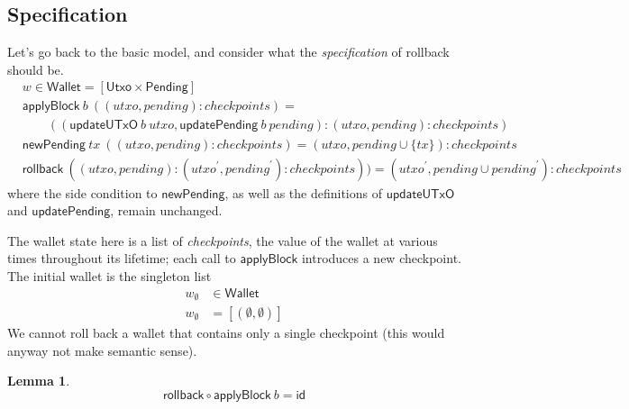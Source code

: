 \documentclass{article}
\newtheorem{lemma}{Lemma}
\begin{document}
\subsection{Specification}
\label{sec:rollback_spec}

Let's go back to the basic model, and consider what the \emph{specification} of
rollback should be.
%
\begin{align*}
& w \in \mathsf{Wallet} = [\mathsf{Utxo} \times \mathsf{Pending}] \\
& \mathsf{applyBlock} ~ b ~ ((\mathit{utxo}, \mathit{pending}) : \mathit{checkpoints}) = \\
& \qquad (( \mathsf{updateUTxO} ~ b ~ \mathit{utxo}
         , \mathsf{updatePending} ~ b ~ \mathit{pending}
         )
         : (\mathit{utxo}, \mathit{pending}) : \mathit{checkpoints}
         ) \\
& \mathsf{newPending} ~ tx ~ ((\mathit{utxo}, \mathit{pending}) : \mathit{checkpoints}) = (\mathit{utxo}, pending \cup \{ tx \} ) : \mathit{checkpoints} \\
& \mathsf{rollback} ~ ((\mathit{utxo}, \mathit{pending}) :  (\mathit{utxo}^\prime, \mathit{pending}^\prime) : \mathit{checkpoints})) =
     (\mathit{utxo}^\prime, \mathit{pending} \cup \mathit{pending}^\prime) : \mathit{checkpoints}
\end{align*}
%
where the side condition to $\mathsf{newPending}$, as well as the definitions
of $\mathsf{updateUTxO}$ and $\mathsf{updatePending}$, remain unchanged.

The wallet state here is a list of \emph{checkpoints}, the value of the wallet
at various times throughout its lifetime; each call to $\mathsf{applyBlock}$
introduces a new checkpoint. The initial wallet is the singleton list
%
\begin{equation}
\begin{split}
w_\emptyset & \in \mathsf{Wallet} \\
w_\emptyset & = [(\emptyset, \emptyset)]
\end{split}
\end{equation}
%
We cannot roll back a wallet that contains only a single checkpoint
(this would anyway not make semantic sense).

\begin{lemma} \label{lemma:rollback_applyBlock_id}
\begin{equation*}
\mathsf{rollback} \circ \mathsf{applyBlock} ~ b = \mathsf{id}
\end{equation*}
\end{lemma}
\end{document}
